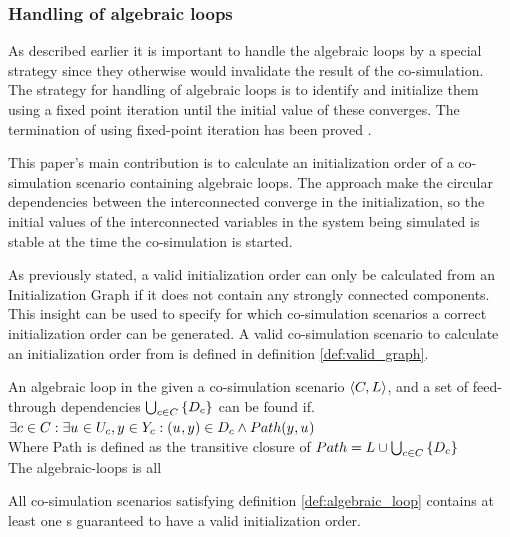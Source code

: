 \documentclass[runningheads]{llncs}
\begin{document}

\subsubsection{Handling of algebraic loops}
As described earlier it is important to handle the algebraic loops by a special strategy since they otherwise would invalidate the result of the co-simulation. The strategy for handling of algebraic loops is to identify and initialize them using a fixed point iteration until the initial value of these converges. The termination of using fixed-point iteration has been proved .

This paper's main contribution is to calculate an initialization order of a co-simulation scenario containing algebraic loops. The approach make the circular dependencies between the interconnected converge in the initialization, so the initial values of the interconnected variables in the system being simulated is stable at the time the co-simulation is started.


\noindent As previously stated, a valid initialization order can only be calculated from an Initialization Graph if it does not contain any strongly connected components. This insight can be used to specify for which co-simulation scenarios a correct initialization order can be generated. A valid co-simulation scenario to calculate an initialization order from is defined in definition \ref{def:valid_graph}.

\begin{definition}\label{def:algebraic_loop}
  An algebraic loop in the given a co-simulation scenario $ \left\langle C, L \right\rangle $, and a set of feed-through dependencies $\bigcup_{c \in C}  \left\{ D_{c} \right\}$ can be found if.\\
  $\exists c \in C : \exists u_{} \in U_{c}, y_{} \in Y_{c}: (u_{},y_{}) \in D_{c} \land Path(y_{}, u_{})$\\
  Where Path is defined as the transitive closure of $Path = L \cup \bigcup_{c \in C}  \left\{ D_{c} \right\}$\\
  The algebraic-loops is all 
\end{definition}

All co-simulation scenarios satisfying definition \ref{def:algebraic_loop} contains at least one s guaranteed to have a valid initialization order.  
\end{document}
